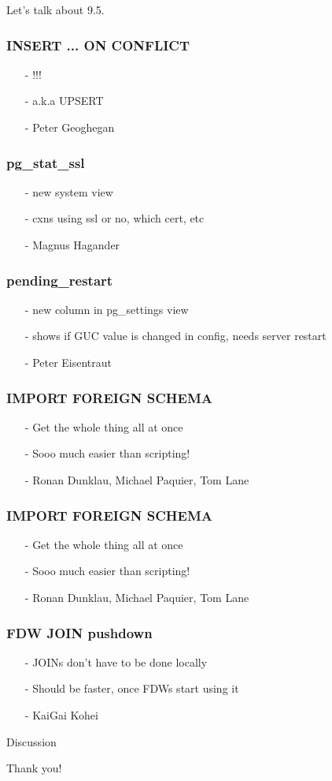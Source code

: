 \documentclass{beamer}
\begin{document}
\frame
{
  \begin{center}
Let's talk about 9.5.
  \end{center}
}

\frame
{
  \frametitle{INSERT ... ON CONFLICT}
  \begin{itemize}
\item[-] !!!
\item[-] a.k.a UPSERT
\item[-] Peter Geoghegan
  \end{itemize}
}

\frame
{
  \frametitle{pg\_stat\_ssl}
  \begin{itemize}
\item[-] new system view
\item[-] cxns using ssl or no, which cert, etc
\item[-] Magnus Hagander
  \end{itemize}
}

\frame
{
  \frametitle{pending\_restart}
  \begin{itemize}
\item[-] new column in pg\_settings view
\item[-] shows if GUC value is changed in config, needs server restart
\item[-] Peter Eisentraut
  \end{itemize}
}

\frame
{
  \frametitle{IMPORT FOREIGN SCHEMA}
  \begin{itemize}
\item[-] Get the whole thing all at once
\item[-] Sooo much easier than scripting!
\item[-] Ronan Dunklau, Michael Paquier, Tom Lane
  \end{itemize}
}

\frame
{
  \frametitle{IMPORT FOREIGN SCHEMA}
  \begin{itemize}
\item[-] Get the whole thing all at once
\item[-] Sooo much easier than scripting!
\item[-] Ronan Dunklau, Michael Paquier, Tom Lane
  \end{itemize}
}

\frame
{
  \frametitle{FDW JOIN pushdown}
  \begin{itemize}
\item[-] JOINs don't have to be done locally
\item[-] Should be faster, once FDWs start using it
\item[-] KaiGai Kohei
  \end{itemize}
}


\frame
{
  \begin{center}
Discussion
  \end{center}
}

\frame
{
  \begin{center}
Thank you!
  \end{center}
}
\end{document}
